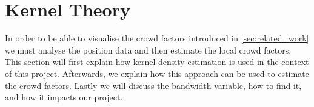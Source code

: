 \section{Kernel Theory}
\label{sec:kernelTheory}
In order to be able to visualise the crowd factors introduced in \cref{sec:related_work} we must analyse the position data and then estimate the local crowd factors. This section will first explain how kernel density estimation is used in the context of this project. Afterwards, we explain how this approach can be used to estimate the crowd factors. Lastly we will discuss the bandwidth variable, how to find it, and how it impacts our project.




